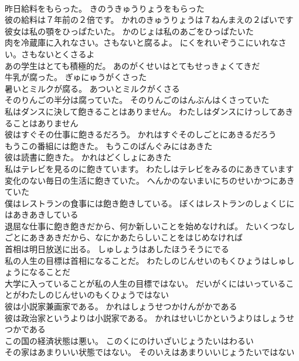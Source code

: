 \documentclass[8pt]{extreport}
\begin{document}
\begin{CJK}{UTF8}{min}
\\	昨日給料をもらった。	きのうきゅうりょうをもらった 
\\	彼の給料は７年前の２倍です。	かれのきゅうりょうは７ねんまえの２ばいです 
\\	彼女は私の顎をひっぱたいた。	かのじょは私のあごをひっぱたいた 
\\	肉を冷蔵庫に入れなさい。さもないと腐るよ。	にくをれいぞうこにいれなさい。さもないとくさるよ 
\\	あの学生はとても積極的だ。	あのがくせいはとてもせっきょくてきだ 
\\	牛乳が腐った。	ぎゅにゅうがくさった 
\\	暑いとミルクが腐る。	あついとミルクがくさる 
\\	そのりんごの半分は腐っていた。	そのりんごのはんぶんはくさっていた 
\\	私はダンスに決して飽きることはありません。	わたしはダンスにけっしてあきることはありません 
\\	彼はすぐその仕事に飽きるだろう。	かれはすぐそのしごとにあきるだろう 
\\	もうこの番組には飽きた。	もうこのばんぐみにはあきた 
\\	彼は読書に飽きた。	かれはどくしょにあきた 
\\	私はテレビを見るのに飽きています。	わたしはテレビをみるのにあきています 
\\	変化のない毎日の生活に飽きていた。	へんかのないまいにちのせいかつにあきていた 
\\	僕はレストランの食事には飽き飽きしている。	ぼくはレストランのしょくじにはあきあきしている 
\\	退屈な仕事に飽き飽きだから、何か新しいことを始めなければ。	たいくつなしごとにあきあきだから、なにかあたらしいことをはじめなければ 
\\	首相は明日放送に出る。	しゅしょうはあしたほうそうにでる 
\\	私の人生の目標は首相になることだ。	わたしのじんせいのもくひょうはしゅしょうになることだ 
\\	大学に入っていることが私の人生の目標ではない。	だいがくにはいっていることがわたしのじんせいのもくひょうではない 
\\	彼は小説家兼画家である。	かれはしょうせつかけんがかである 
\\	彼は政治家というよりは小説家である。	かれはせいじかというよりはしょうせつかである 
\\	この国の経済状態は悪い。	このくにのけいざいじょうたいはわるい 
\\	その家はあまりいい状態ではない。	そのいえはあまりいいじょうたいではない 

\end{CJK}
\end{document}
